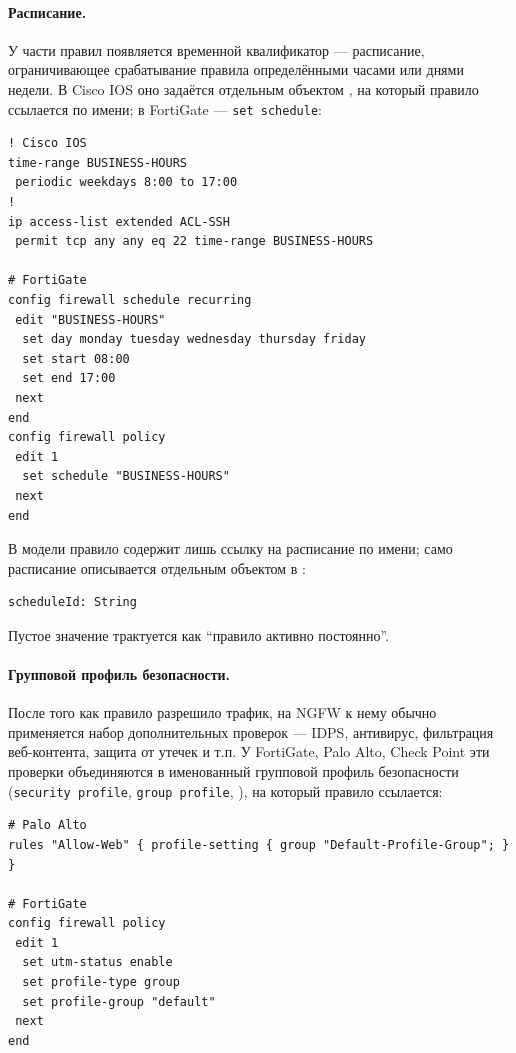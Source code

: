 \paragraph{Расписание.} У части правил появляется временной квалификатор --- расписание, ограничивающее срабатывание правила определёнными часами или днями недели. В Cisco IOS оно задаётся отдельным объектом , на который правило ссылается по имени; в FortiGate --- \texttt{set schedule}:

\begin{verbatim}
! Cisco IOS
time-range BUSINESS-HOURS
 periodic weekdays 8:00 to 17:00
!
ip access-list extended ACL-SSH
 permit tcp any any eq 22 time-range BUSINESS-HOURS

# FortiGate
config firewall schedule recurring
 edit "BUSINESS-HOURS"
  set day monday tuesday wednesday thursday friday
  set start 08:00
  set end 17:00
 next
end
config firewall policy
 edit 1
  set schedule "BUSINESS-HOURS"
 next
end
\end{verbatim}

В модели правило содержит лишь ссылку на расписание по имени; само расписание описывается отдельным объектом в :

\begin{lstlisting}[style=schemastyle]
scheduleId: String
\end{lstlisting}

Пустое значение трактуется как ``правило активно постоянно''.

\paragraph{Групповой профиль безопасности.} После того как правило разрешило трафик, на NGFW к нему обычно применяется набор дополнительных проверок --- IDPS, антивирус, фильтрация веб-контента, защита от утечек и т.п. У FortiGate, Palo Alto, Check Point эти проверки объединяются в именованный групповой профиль безопасности (\texttt{security profile}, \texttt{group profile}, ), на который правило ссылается:

\begin{verbatim}
# Palo Alto
rules "Allow-Web" { profile-setting { group "Default-Profile-Group"; } }

# FortiGate
config firewall policy
 edit 1
  set utm-status enable
  set profile-type group
  set profile-group "default"
 next
end
\end{verbatim}


